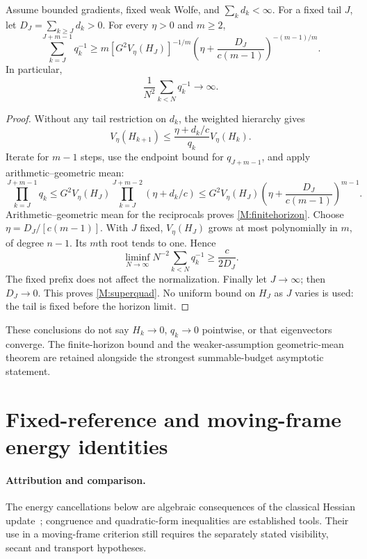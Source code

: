 \begin{theorem}\label{M:superquadratic}
Assume bounded gradients, fixed weak Wolfe, and $\sum_kd_k<\infty$. For a fixed tail $J$, let $D_J=\sum_{k\ge J}d_k>0$. For every $\eta>0$ and $m\ge2$,
\begin{equation}\label{M:finitehorizon}
 \sum_{k=J}^{J+m-1}q_k^{-1}\ge
 m[G^2V_\eta(H_J)]^{-1/m}
 \left(\eta+\frac{D_J}{c(m-1)}\right)^{-(m-1)/m}.
\end{equation}
In particular,
\begin{equation}\label{M:superquad}
 \frac1{N^2}\sum_{k<N}q_k^{-1}\longrightarrow\infty.
\end{equation}
\end{theorem}
\begin{proof}
Without any tail restriction on $d_k$, the weighted hierarchy gives
\[
 V_\eta(H_{k+1})\le\frac{\eta+d_k/c}{q_k}V_\eta(H_k).
\]
Iterate for $m-1$ steps, use the endpoint bound for $q_{J+m-1}$, and apply arithmetic--geometric mean:
\[
 \prod_{k=J}^{J+m-1}q_k
 \le G^2V_\eta(H_J)\prod_{k=J}^{J+m-2}(\eta+d_k/c)
 \le G^2V_\eta(H_J)\left(\eta+\frac{D_J}{c(m-1)}\right)^{m-1}.
\]
Arithmetic--geometric mean for the reciprocals proves \eqref{M:finitehorizon}. Choose $\eta=D_J/[c(m-1)]$. With $J$ fixed, $V_\eta(H_J)$ grows at most polynomially in $m$, of degree $n-1$. Its $m$th root tends to one. Hence
\[
 \liminf_{N\to\infty}N^{-2}\sum_{k<N}q_k^{-1}\ge \frac{c}{2D_J}.
\]
The fixed prefix does not affect the normalization. Finally let $J\to\infty$; then $D_J\to0$. This proves \eqref{M:superquad}. No uniform bound on $H_J$ as $J$ varies is used: the tail is fixed before the horizon limit.
\end{proof}
These conclusions do not say $H_k\to0$, $q_k\to0$ pointwise, or that eigenvectors converge. The finite-horizon bound and the weaker-assumption geometric-mean theorem are retained alongside the strongest summable-budget asymptotic statement.

\section{Fixed-reference and moving-frame energy identities}
\label{M:energy}
\paragraph{Attribution and comparison.}
The energy cancellations below are algebraic consequences of the classical Hessian update~\cite[Section~5]{FND_N92}; congruence and quadratic-form inequalities are established tools. Their use in a moving-frame criterion still requires the separately stated visibility, secant and transport hypotheses.

